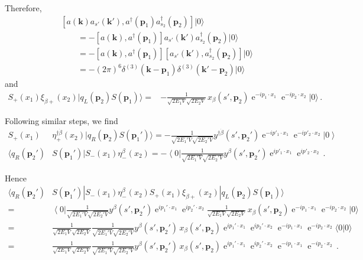 Therefore,
\begin{align}
&\left[ a(\mathbf{k})a_{s'}(\mathbf{k}'),a^\dagger(\mathbf{p}_1)a_{s_2}^\dagger(\mathbf{p}_2)\right] |0\rangle \nonumber\\
&\qquad=
-
 \left[ a(\mathbf{k}),a^\dagger(\mathbf{p}_1)\right]a_{s'}(\mathbf{k}')a_{s_2}^\dagger(\mathbf{p}_2) |0\rangle \nonumber\\
&\qquad=-
  \left[ a(\mathbf{k}),a^\dagger(\mathbf{p}_1)\right] \left[ a_{s'}(\mathbf{k}'),a_{s_2}^\dagger(\mathbf{p}_2)  \right] |0\rangle \nonumber\\
&\qquad= -(2\pi)^6  
    \delta^{(3)}(\mathbf{k}-\mathbf{p}_1)\delta^{(3)}(\mathbf{k}'-\mathbf{p}_2)|0\rangle
\end{align}
and
\begin{align}
\label{eq:ssbkqlel}
S_{+}(x_1)\xi_{\beta +}(x_2)|q_L(\mathbf{p}_2)S(\mathbf{p}_1)\rangle  =&
 -\frac{1}{\sqrt{2E_1 V}\sqrt{2E_2 V}}\,x_{\beta}(s',\mathbf{p}_2)\operatorname{e}^{-i p_1\cdot x_1}\operatorname{e}^{-i p_2\cdot x_2}|0\rangle\,.
\end{align}

Following similar steps, we find
\begin{align}
\label{eq:ssberer}
  S_{+}(x_1)& \eta^{\dagger\dot{\beta}}_{+}(x_2)|q_R(\mathbf{p}_2)S(\mathbf{p}_1')\rangle
 =-\frac{1 }{\sqrt{2 E_1'V}\sqrt{2 E_2'V}}  y^{\dagger\dot{\beta}}(s',\mathbf{p}_2')
 \operatorname{e}^{-i p'_1\cdot x_1}\operatorname{e}^{-i p'_2\cdot x_2}\left|0\right\rangle \\
  \langle q_R(\mathbf{p}_2')&S(\mathbf{p}_1')| S_{-}(x_1)\eta^{\beta}_{-}(x_2)
 =-\left\langle 0\right|\frac{1 }{\sqrt{2 E_1'V}\sqrt{2 E_2'V}}  y^{\beta}(s',\mathbf{p}_2')
 \operatorname{e}^{i p'_1\cdot x_1}\operatorname{e}^{i p'_2\cdot x_2}\,.
\end{align}

Hence
\begin{align}
  \langle q_R(\mathbf{p}_2')&S(\mathbf{p}_1')| S_{-}(x_1)\eta^{\beta}_{-}(x_2)
  S_{+}(x_1)\xi_{\beta +}(x_2)|q_L(\mathbf{p}_2)S(\mathbf{p}_1)\rangle \nonumber\\
=&\left\langle 0\right|\frac{1 }{\sqrt{2 E_1'V}\sqrt{2 E_2'V}}  y^{\beta}(s',\mathbf{p}_2')
   \operatorname{e}^{i p_1'\cdot x_1}\operatorname{e}^{i p_2'\cdot x_2}
\frac{1}{\sqrt{2E_1 V}\sqrt{2E_2 V}}\,x_{\beta}(s',\mathbf{p}_2)\operatorname{e}^{-i p_1\cdot x_1}\operatorname{e}^{-i p_2\cdot x_2}|0\rangle \nonumber\\
=&\frac{1}{\sqrt{2E_1 V}\sqrt{2E_2 V}}\frac{1 }{\sqrt{2 E_1'V}\sqrt{2 E_2'V}}  y^{\beta}(s',\mathbf{p}_2')\,x_{\beta}(s',\mathbf{p}_2)
   \operatorname{e}^{i p_1'\cdot x_1}\operatorname{e}^{i p_2'\cdot x_2}
\operatorname{e}^{-i p_1\cdot x_1}\operatorname{e}^{-i p_2\cdot x_2}\langle 0|0\rangle \nonumber\\
=&\frac{1}{\sqrt{2E_1 V}\sqrt{2E_2 V}}\frac{1 }{\sqrt{2 E_1'V}\sqrt{2 E_2'V}}  y^{\beta}(s',\mathbf{p}_2')\,x_{\beta}(s',\mathbf{p}_2)
   \operatorname{e}^{i p_1'\cdot x_1}\operatorname{e}^{i p_2'\cdot x_2}
\operatorname{e}^{-i p_1\cdot x_1}\operatorname{e}^{-i p_2\cdot x_2}\,.
\end{align}

